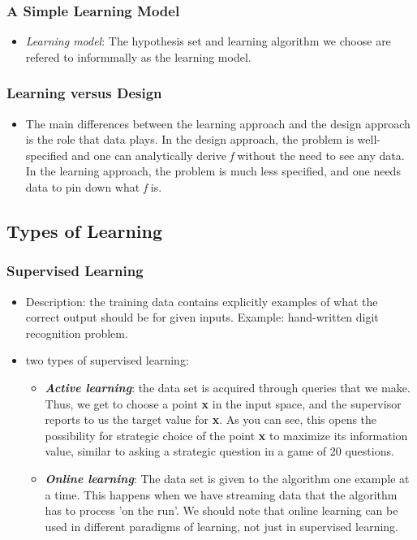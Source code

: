 \subsubsection{A Simple Learning Model}
\begin{itemize}[noitemsep, topsep=0pt]
    \item \textit{Learning model}: The hypothesis set and learning algorithm we choose are refered to informmally as the learning model.
\end{itemize}

\subsubsection{Learning versus Design}
\begin{itemize}[noitemsep, topsep=0pt]
    \item The main differences between the learning approach and the design approach is the role that data plays. In the design approach, the problem is well-specified and one can analytically derive \textit{f} without the need to see any data. In the learning approach, the problem is much less specified, and one needs data to pin down what \textit{f} is.
\end{itemize}

\subsection{Types of Learning}
\subsubsection{Supervised Learning}
\begin{itemize}[noitemsep, topsep=0pt]
    \item Description: the training data contains explicitly examples of what the correct output should be for given inputs. Example: hand-written digit recognition problem.
    \item two types of supervised learning:
    \begin{itemize}[noitemsep, topsep=0pt]
        \item \textbf{\textit{Active learning}}: the data set is acquired through queries that we make. Thus, we get to choose a point \textbf{x} in the input space, and the supervisor reports to us the target value for \textbf{x}. As you can see, this opens the possibility for strategic choice of the point \textbf{x} to maximize its information value, similar to asking a strategic question in a game of 20 questions.
        \item \textbf{\textit{Online learning}}: The data set is given to the algorithm one example at a time. This happens when we have streaming data that the algorithm has to process 'on the run'. We should note that online learning can be used in different paradigms of learning, not just in supervised learning.
    \end{itemize}
\end{itemize}

